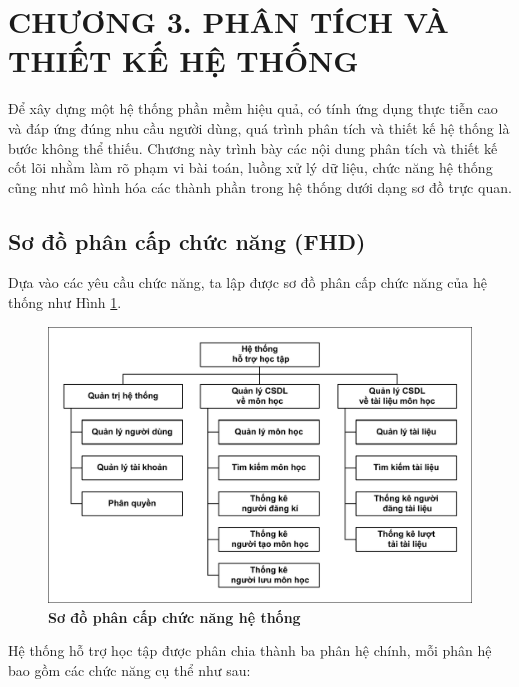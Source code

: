 \documentclass{article}
\begin{document}
	\section*{CHƯƠNG 3. PHÂN TÍCH VÀ THIẾT KẾ HỆ THỐNG}
	\setcounter{section}{3}
	\setcounter{subsection}{0}
	\setcounter{figure}{0}
	\setcounter{table}{0}
	
	Để xây dựng một hệ thống phần mềm hiệu quả, có tính ứng dụng thực tiễn cao và đáp ứng đúng nhu cầu người dùng, quá trình phân tích và thiết kế hệ thống là bước không thể thiếu. Chương này trình bày các nội dung phân tích và thiết kế cốt lõi nhằm làm rõ phạm vi bài toán, luồng xử lý dữ liệu, chức năng hệ thống cũng như mô hình hóa các thành phần trong hệ thống dưới dạng sơ đồ trực quan.
	
	\subsection{Sơ đồ phân cấp chức năng (FHD)}
	
	Dựa vào các yêu cầu chức năng, ta lập được sơ đồ phân cấp chức năng của hệ thống như Hình \ref{fig31}.
	
	\begin{figure}[!ht]
		\centering
		\includegraphics[trim= 10pt 10pt 10pt 10pt, clip, width=16cm]{fhd_fig31_2.pdf}
		\caption [Sơ đồ phân cấp chức năng hệ thống]{\bfseries \fontsize{12pt}{0pt}\selectfont Sơ đồ phân cấp chức năng hệ thống}
		\label{fig31}
	\end{figure}
	
	Hệ thống hỗ trợ học tập được phân chia thành ba phân hệ chính, mỗi phân hệ bao gồm các chức năng cụ thể như sau:
	
\end{document}
